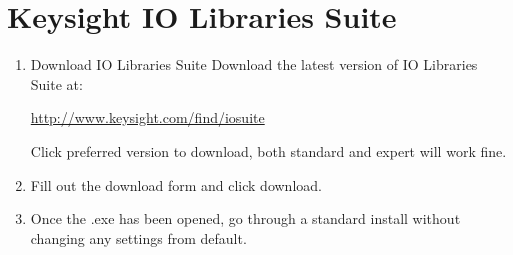 \documentclass{article}
\begin{document}
\section*{Keysight IO Libraries Suite}
\begin{enumerate}
    \item Download IO Libraries Suite
    Download the latest version of IO Libraries Suite at:
    \begin{center}
        \url{http://www.keysight.com/find/iosuite}
    \end{center}
    Click preferred version to download, both standard and expert will work fine.
    
    \vspace{.1in}
    \begin{center}
    \end{center}
    \vspace{.1in}
    \item Fill out the download form and click download.
    
    \vspace{.1in}
    \begin{center}
    \end{center}
    \vspace{.1in}
    
    \item Once the .exe has been opened, go through a standard install without changing any settings from default.
    

\end{enumerate}
\end{document}
